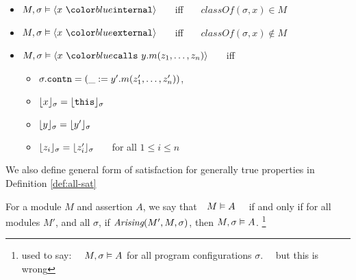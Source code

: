 \begin{definition}
\begin{itemize}
\begin{itemize}
\end{itemize}
\item
$\satisfiesA{M}{\sigma}{\internal{x}}$ \ \ \ iff \ \ \  
$\textit{classOf}(\sigma,x) \in M$
\item
$\satisfiesA{M}{\sigma}{\external{x}}$ \ \ \ iff \ \ \  
$\textit{classOf}(\sigma,x) \not\in M$
\item
$\satisfiesA{M}{\sigma}{\calls{x}{y}{m}{z_1, \ldots, z_n}}$ \ \ \ iff \ \ \ 
\begin{itemize}
\item
$\sigma.{\texttt{contn}} = (\_ := y'.m(z'_1,\ldots,z'_n))$, %
\item
$\lfloor x \rfloor_{\sigma} = \lfloor {\texttt{this}} \rfloor_{\sigma}$  %
\item
${{\lfloor y \rfloor_{\sigma} = \lfloor y' \rfloor_{\sigma}}}$ %
\item
$\lfloor z_i \rfloor_{\sigma} = \lfloor z'_i \rfloor_{\sigma}$ \ \ \ for all $1\!\leq i\!\leq n$
\end{itemize}
\end{itemize}
\end{definition}




We also define general form of satisfaction for generally true properties in 
Definition \ref{def:all-sat}
\begin{definition}%
\label{def:all-sat}
For a module $M$ and assertion $A$, we say that\ \  $M \vDash A$ \ \ if and only if 
for all modules $M'$, and all $\sigma$, if $\textit{Arising}(M', M, \sigma)$, then $M , \sigma \vDash A$.
\footnote{used to say: \ \ $M , \sigma \vDash A$ for all program configurations $\sigma$. \ \  
but this is wrong }
\end{definition}

	
